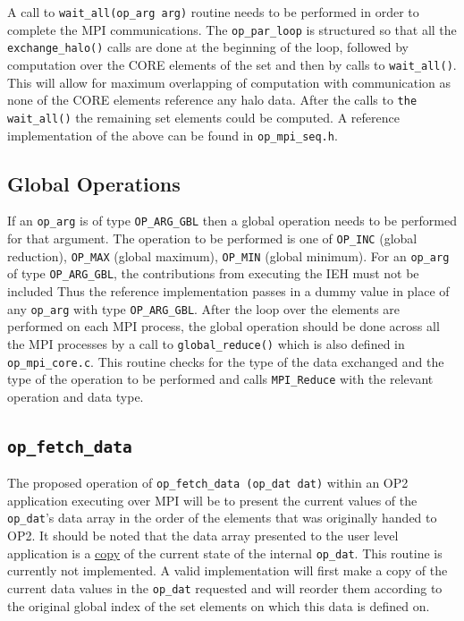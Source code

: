 \documentclass[11pt]{article}
\begin{document}
\noindent A call to \texttt{wait\_all(op\_arg arg)} routine needs to be performed in order to complete the MPI
communications. The \texttt{op\_par\_loop} is structured so that all the \texttt{exchange\_halo()} calls are done at the
beginning of the loop, followed by computation over the CORE elements of the set and then by calls to
\texttt{wait\_all()}. This will allow for maximum overlapping of computation with communication as none of the CORE
elements reference any halo data. After the calls to \texttt{the wait\_all()} the remaining set elements could be
computed. A reference implementation of the above can be found in \texttt{op\_mpi\_seq.h}.

\subsection{Global Operations}\label{subsec/globalops}

If an \texttt{op\_arg} is of type \texttt{OP\_ARG\_GBL} then a global operation needs to be performed for that
argument. The operation to be performed is one of \texttt{OP\_INC} (global reduction), \texttt{OP\_MAX} (global
maximum), \texttt{OP\_MIN} (global minimum). For an \texttt{op\_arg} of type \texttt{OP\_ARG\_GBL}, the contributions
from executing the IEH must not be included Thus the reference implementation passes in a dummy value in place of any
\texttt{op\_arg} with type \texttt{OP\_ARG\_GBL}. After the loop over the elements are performed on each MPI process,
the global operation should be done across all the MPI processes by a call to \texttt{global\_reduce()} which is also
defined in \texttt{op\_mpi\_core.c}. This routine checks for the type of the data exchanged and the type of the
operation to be performed and calls \texttt{MPI\_Reduce} with the relevant operation and data type.

\subsection{\texttt{op\_fetch\_data} }\label{subsec/putfetch}
The proposed operation of \texttt{op\_fetch\_data (op\_dat dat)} within an OP2 application executing over MPI will be to
present the current values of the \texttt{op\_dat}'s data array in the order of the elements that was originally handed
to OP2. It should be noted that the data array presented to the user level application is a \underline{copy} of the
current state of the internal \texttt{op\_dat}. This routine is currently not implemented. A valid implementation will
first make a copy of the current data values in the \texttt{op\_dat} requested and will reorder them according to the
original global index of the set elements on which this data is defined on.
\end{document}
